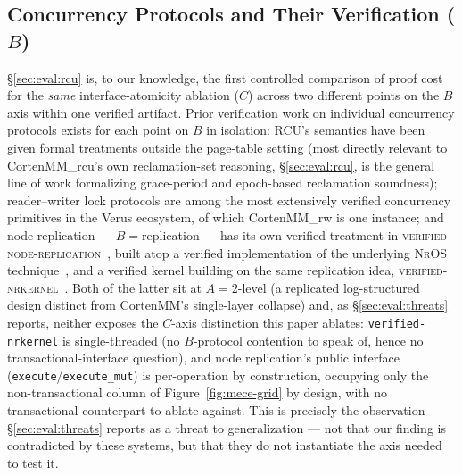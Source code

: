 \documentclass[10pt]{article}
\newcommand{\vfn}[1]{\texttt{#1}}
\begin{document}
\subsection{Concurrency Protocols and Their Verification ($B$)}
\label{sec:related:concurrency}

\S\ref{sec:eval:rcu} is, to our knowledge, the first controlled
comparison of proof cost for the \emph{same} interface-atomicity
ablation ($C$) across two different points on the $B$ axis within one
verified artifact. Prior verification work on individual concurrency
protocols exists for each point on $B$ in isolation: RCU's semantics
have been given formal treatments outside the page-table setting (most
directly relevant to CortenMM\_rcu's own reclamation-set reasoning,
\S\ref{sec:eval:rcu}, is the general line of work formalizing
grace-period and epoch-based reclamation soundness); reader--writer
lock protocols are among the most extensively verified concurrency
primitives in the Verus ecosystem, of which CortenMM\_rw is one
instance; and node replication --- $B{=}$replication --- has its own
verified treatment in \textsc{verified-node-replication}~\cite{nr},
built atop a verified implementation of the underlying \textsc{NrOS}
technique~\cite{nros}, and a verified kernel building on the same
replication idea, \textsc{verified-nrkernel}~\cite{nrkernel}. Both of
the latter sit at $A{=}2$-level (a replicated log-structured design
distinct from CortenMM's single-layer collapse) and, as
\S\ref{sec:eval:threats} reports, neither exposes the $C$-axis
distinction this paper ablates: \vfn{verified-nrkernel} is
single-threaded (no $B$-protocol contention to speak of, hence no
transactional-interface question), and node replication's public
interface (\vfn{execute}/\vfn{execute\_mut}) is per-operation by
construction, occupying only the non-transactional column of
Figure~\ref{fig:mece-grid} by design, with no transactional counterpart
to ablate against. This is precisely the observation
\S\ref{sec:eval:threats} reports as a threat to
generalization --- not that our finding is contradicted by these
systems, but that they do not instantiate the axis needed to test it.
\end{document}
